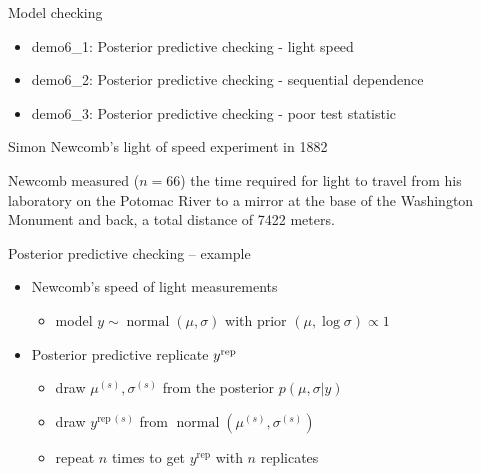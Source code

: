 \documentclass[t]{beamer}
\DeclareMathOperator{\normal}{normal}
\begin{document}
\begin{frame}
  
  {\Large\color{navyblue} Model checking}

  \begin{itemize}
  \item demo6\_1: Posterior predictive checking - light speed
  \item demo6\_2: Posterior predictive checking - sequential dependence
  \item demo6\_3: Posterior predictive checking - poor test statistic
  \end{itemize}

\end{frame}

\begin{frame}
  
  {\large\color{navyblue} Simon Newcomb's light of speed experiment in 1882}

  {\small
  Newcomb measured ($n=66$) the time required for light to travel from
  his laboratory on the Potomac River to a mirror at the base of the
  Washington Monument and back, a total distance of 7422 meters.}

\end{frame}

\begin{frame}{Posterior predictive checking -- example}

  \begin{itemize}
  \item<1-> Newcomb's speed of light measurements 
    \begin{itemize}
    \item model $y\sim\normal(\mu,\sigma)$ with prior $(\mu,\log\sigma)\propto 1$
    \end{itemize}
  \item<2-> Posterior predictive replicate $y^{\rm rep}$
    \begin{itemize}
    \item<3-> draw $\mu^{(s)},\sigma^{(s)}$ from the posterior $p(\mu,\sigma|y)$
    \item<4-> draw $y^{\mathrm{rep}\,(s)}$ from $\normal(\mu^{(s)},\sigma^{(s)})$
    \item<5-> repeat $n$ times to get $y^{\mathrm{rep}}$ with $n$ replicates\\~\\
      \end{itemize}
    \end{itemize}

\end{frame}
\end{document}
